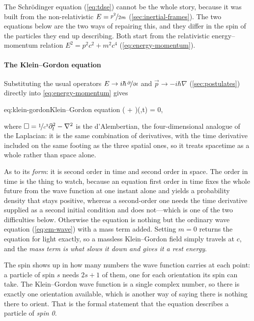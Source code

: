    The Schrödinger equation (\cref{eq:tdse}) cannot be the whole story, because it was built from the non-relativistic $E = \nicefrac{p^{2}}{2m}$ (\cref{sec:inertial-frames}). The two equations below are the two ways of repairing this, and they differ in the spin of the particles they end up describing. Both start from the relativistic energy--momentum relation $E^{2} = p^{2}c^{2} + m^{2}c^{4}$ (\cref{eq:energy-momentum}).

    \paragraph{The Klein--Gordon equation}

    Substituting the usual operators $E \to i\hbar\,\nicefrac{\partial}{\partial t}$ and $\vec{p} \to -i\hbar\nabla$ (\cref{sec:postulates}) directly into \cref{eq:energy-momentum} gives

    \begin{keyeq}{eq:klein-gordon}{Klein--Gordon equation}
        \left( \Box +  \right)\psi(,t) = 0,
    \end{keyeq}

    where $\Box = \nicefrac{1}{c^2}\partial_t^2 - \nabla^2$ is the d'Alembertian, the four-dimensional analogue of the Laplacian: it is the same combination of derivatives, with the time derivative included on the same footing as the three spatial ones, so it treats spacetime as a whole rather than space alone.

    As to its \emph{form}: it is second order in time and second order in space. The order in time is the thing to watch, because an equation first order in time fixes the whole future from the wave function at one instant alone and yields a probability density that stays positive, whereas a second-order one needs the time derivative supplied as a second initial condition and does not---which is one of the two difficulties below. Otherwise the equation is nothing but the ordinary wave equation (\cref{eq:em-wave}) with a mass term added. Setting $m=0$ returns the equation for light exactly, so a massless Klein--Gordon field simply travels at $c$, and the \emph{mass term is what slows it down and gives it a rest energy}.

    The spin shows up in how many numbers the wave function carries at each point: a particle of spin $s$ needs $2s+1$ of them, one for each orientation its spin can take. The Klein--Gordon wave function is a single complex number, so there is exactly one orientation available, which is another way of saying there is nothing there to orient. That is the formal statement that the equation describes a particle of \emph{spin 0}.

